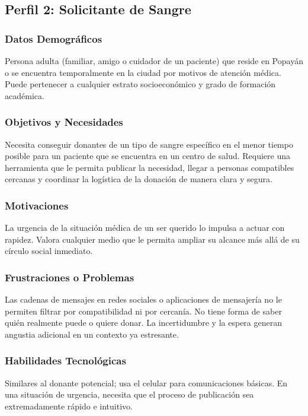 \documentclass[12pt, a4paper]{article}
\begin{document}
\subsection{Perfil 2: Solicitante de Sangre}

\subsubsection{Datos Demográficos}
Persona adulta (familiar, amigo o cuidador de un paciente) que reside en Popayán o se encuentra temporalmente en la ciudad por motivos de atención médica. Puede pertenecer a cualquier estrato socioeconómico y grado de formación académica.

\subsubsection{Objetivos y Necesidades}
Necesita conseguir donantes de un tipo de sangre específico en el menor tiempo posible para un paciente que se encuentra en un centro de salud. Requiere una herramienta que le permita publicar la necesidad, llegar a personas compatibles cercanas y coordinar la logística de la donación de manera clara y segura.

\subsubsection{Motivaciones}
La urgencia de la situación médica de un ser querido lo impulsa a actuar con rapidez. Valora cualquier medio que le permita ampliar su alcance más allá de su círculo social inmediato.

\subsubsection{Frustraciones o Problemas}
Las cadenas de mensajes en redes sociales o aplicaciones de mensajería no le permiten filtrar por compatibilidad ni por cercanía. No tiene forma de saber quién realmente puede o quiere donar. La incertidumbre y la espera generan angustia adicional en un contexto ya estresante.

\subsubsection{Habilidades Tecnológicas}
Similares al donante potencial; usa el celular para comunicaciones básicas. En una situación de urgencia, necesita que el proceso de publicación sea extremadamente rápido e intuitivo.
\end{document}

